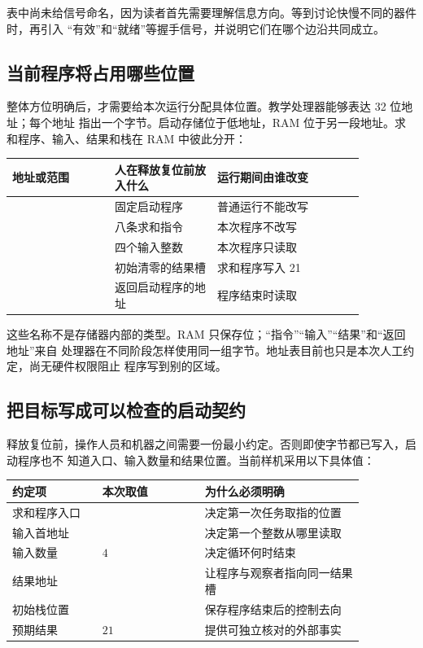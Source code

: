 表中尚未给信号命名，因为读者首先需要理解信息方向。等到讨论快慢不同的器件时，再引入
“有效”和“就绪”等握手信号，并说明它们在哪个边沿共同成立。

\subsection{当前程序将占用哪些位置}

整体方位明确后，才需要给本次运行分配具体位置。教学处理器能够表达 32 位地址；每个地址
指出一个字节。启动存储位于低地址，RAM 位于另一段地址。求和程序、输入、结果和栈在 RAM
中彼此分开：

\begin{longtable}{|L{0.25\linewidth}|L{0.25\linewidth}|L{0.36\linewidth}|}
\hline
{}
地址或范围 & 人在释放复位前放入什么 & 运行期间由谁改变 \\ \hline
{} & 固定启动程序 & 普通运行不能改写 \\ \hline
{} & 八条求和指令 & 本次程序不改写 \\ \hline
{} & 四个输入整数 & 本次程序只读取 \\ \hline
{} & 初始清零的结果槽 & 求和程序写入 21 \\ \hline
{} & 返回启动程序的地址 & 程序结束时读取 \\ \hline
\end{longtable}

这些名称不是存储器内部的类型。RAM 只保存位；“指令”“输入”“结果”和“返回地址”来自
处理器在不同阶段怎样使用同一组字节。地址表目前也只是本次人工约定，尚无硬件权限阻止
程序写到别的区域。

\subsection{把目标写成可以检查的启动契约}

释放复位前，操作人员和机器之间需要一份最小约定。否则即使字节都已写入，启动程序也不
知道入口、输入数量和结果位置。当前样机采用以下具体值：

\begin{longtable}{|L{0.22\linewidth}|L{0.25\linewidth}|L{0.39\linewidth}|}
\hline
{}
约定项 & 本次取值 & 为什么必须明确 \\ \hline
求和程序入口 &  & 决定第一次任务取指的位置 \\ \hline
输入首地址 &  & 决定第一个整数从哪里读取 \\ \hline
输入数量 & \(4\) & 决定循环何时结束 \\ \hline
结果地址 &  & 让程序与观察者指向同一结果槽 \\ \hline
初始栈位置 &  & 保存程序结束后的控制去向 \\ \hline
预期结果 & \(21\) & 提供可独立核对的外部事实 \\ \hline
\end{longtable}

